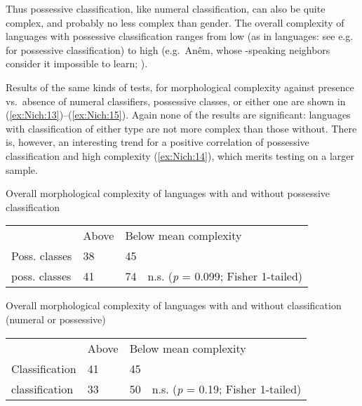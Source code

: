 \documentclass[output=collectionpaper]{langsci/langscibook}
\begin{document}
Thus possessive classification, like numeral classification, can also be quite complex, and probably no less complex than gender. The overall complexity of languages with possessive classification ranges from low (as in  languages: see e.g.\ \citealt{Wilson1982} for  possessive classification) to high (e.g.\ Anêm, whose -speaking neighbors consider it impossible to learn; \citealt[51]{Thurston1982}).

Results of the same kinds of tests, for morphological complexity against presence vs.\ absence of numeral classifiers, possessive classes, or either one are shown in (\ref{ex:Nich:13})--(\ref{ex:Nich:15}). Again none of the results are significant: languages with classification of either type are not more complex than those without. There is, however, an interesting trend for a positive correlation of possessive classification and high complexity (\ref{ex:Nich:14}), which merits testing on a larger sample.

%

\ea
\label{ex:Nich:14}
Overall morphological complexity of languages with and without possessive classification\\
\medskip
\begin{tabular}{p{2.7cm}p{1.3cm}p{1.3cm}l}
				 &Above 	 &	\multicolumn{2}{l}{Below mean complexity} \\
	Poss. classes	 &	38	 &	45 \\
	\ili{No} poss. classes	 &41	 &	74	 &n.s. (\textit{p} = 0.099; Fisher 1-tailed)	  \\
\end{tabular}
\z

\ea
\label{ex:Nich:15}
Overall morphological complexity of languages with and without classification (numeral or possessive)\\
\medskip
\begin{tabular}{p{2.7cm}p{1.3cm}p{1.3cm}l}
				 &Above 	 &	\multicolumn{2}{l}{Below mean complexity} \\
	Classification		 &41	 &	45 \\
	\ili{No} classification	 &33	 &	50 &	n.s.  (\textit{p} = 0.19; Fisher 1-tailed) \\
\end{tabular}
\z
\end{document}
